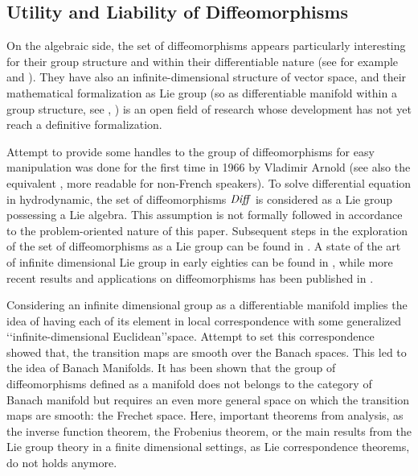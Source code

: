 \subsection{Utility and Liability of Diffeomorphisms}\label{se:diffe_util_and_liab}

On the algebraic side, the set of diffeomorphisms appears particularly interesting for their group structure and within their differentiable nature (see for example \cite{michor1980manifolds} and \cite{lempert1997problem}). They have also an infinite-dimensional structure of vector space, and their mathematical formalization as Lie group (so as differentiable manifold within a group structure, see \cite{warner}, \cite{lee2012introduction}) is an open field of research whose development has not yet reach a definitive formalization.

Attempt to provide some handles to the group of diffeomorphisms for easy manipulation was done for the first time in 1966 by Vladimir Arnold \cite{arnold1966geometrie} (see also the equivalent \cite{arnold1998topological}, more readable for non-French speakers). To solve differential equation in hydrodynamic, the set of diffeomorphisms $\text{\emph{Diff}}$ is considered as a Lie group possessing a Lie algebra. This assumption is not formally followed in accordance to the problem-oriented nature of this paper. Subsequent steps in the exploration of the set of diffeomorphisms as a Lie group can be found in \cite{marsden1970hamiltonian, ebin1970groups, omori1970group, michor1980manifolds, leslie1983lie}. A state of the art of  infinite dimensional Lie group in early eighties can be found in \cite{Milnor:84:remarks}, while more recent results and applications on diffeomorphisms has been published in \cite{ovsienko1992integrals, bauer2010sobolev, schmid2010infinite,  bauer2011geodesic}.

Considering an infinite dimensional group as a differentiable manifold implies the idea of having each of its element in local correspondence with some generalized \lq\lq infinite-dimensional Euclidean\rq\rq\phantom{z}space. Attempt to set this correspondence showed that, the transition maps are smooth over the Banach spaces. This led to the idea of Banach Manifolds. It has been shown \cite{khesin2008geometry} that the group of diffeomorphisms defined as a manifold does not belongs to the category of Banach manifold but requires an even more general space on which the transition maps are smooth: the Frechet space. Here, important theorems from analysis, as the inverse function theorem, the Frobenius theorem, or the main results from the Lie group theory in a finite dimensional settings, as Lie correspondence theorems, do not holds anymore. 

